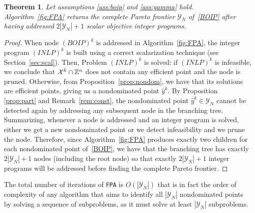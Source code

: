 \documentclass[preprint,12pt]{elsarticle}
\newtheorem{theorem}{Theorem}[section]
\def\X{{\cal X}}
\def\Z{\mathbb{Z}}
\begin{document}
\begin{theorem}\label{theo: convergence}
Let assumptions \ref{ass:boip} and \ref{ass:gamma} hold.
 Algorithm~\ref{fig:FPA} returns the complete Pareto frontier $\mathcal{Y}_N$ of~\eqref{BOIP} after having addressed
$2|\mathcal{Y}_N|+1$ scalar objective integer programs.
\end{theorem}
\begin{proof}
When node $(BOIP)^k$ is addressed in Algorithm~\ref{fig:FPA}, the integer program $(INLP)^k$ is built
using  a correct
scalarization technique (see Section~\ref{sec:scal}).
Then, Problem $(INLP)^k$ is solved: if $(INLP)^k$ is infeasible, we conclude that $\X^k\cap \Z^n$ does not contain any efficient point and the node is pruned.
Otherwise, from Proposition~\ref{prop:nondom}, we have that its solutions are efficient points, giving us a nondominated point $\hat y^k$.
By Proposition \ref{prop:part} and Remark~\ref{rem:const}, the nondominated point $\hat y^k\in \mathcal{Y}_N$ cannot be detected again by
addressing any subsequent node in the branching tree.
Summarizing, whenever a node is addressed and an integer program is solved, either we get a new nondominated point or we detect infeasibility
and we prune the node.
Therefore, since Algorithm~\ref{fig:FPA} produces exactly two children for each nondominated point of~\eqref{BOIP},
we have that the branching tree has exactly  $2|\mathcal{Y}_N|+1$ nodes (including the root node) so that exactly  $2|\mathcal{Y}_N|+1$  integer programs will be addressed before finding the complete Pareto frontier.
\end{proof}

The total number of iterations of \texttt{FPA} is $O(|\mathcal{Y}_N|)$ that is in fact the order of complexity of any algorithm
 that aims to identify all
$|\mathcal{Y}_N|$ nondominated points by solving a sequence of subproblems, as it must solve at least
$|\mathcal{Y}_N|$ subproblems.
\end{document}
